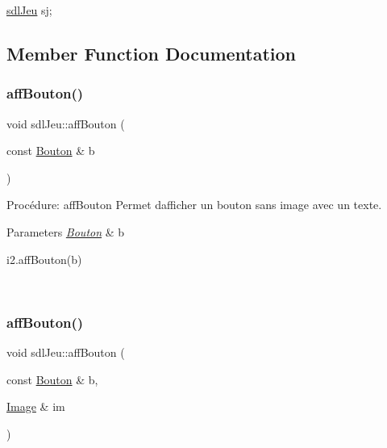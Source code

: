\begin{DoxyCode}
\hyperlink{classsdlJeu}{sdlJeu} sj;
\end{DoxyCode}
 

\subsection{Member Function Documentation}
\mbox{\label{classsdlJeu_a5ada7438cc0d3226ad2aa535a523a895}} 
\subsubsection{\texorpdfstring{aff\+Bouton()}{affBouton()}\hspace{0.1cm}{\footnotesize\ttfamily [1/2]}}
{\footnotesize\ttfamily void sdl\+Jeu\+::aff\+Bouton (\begin{DoxyParamCaption}\item[{const \hyperlink{classBouton}{Bouton} \&}]{b }\end{DoxyParamCaption})}



Procédure\+: aff\+Bouton Permet d\textquotesingle{}afficher un bouton sans image avec un texte. 


\begin{DoxyParams}{Parameters}
{\em \hyperlink{classBouton}{Bouton}} & b 
\begin{DoxyCode}
i2.affBouton(b)
\end{DoxyCode}
 \\
\hline
\end{DoxyParams}
\mbox{\label{classsdlJeu_a71bd3bdde9cf7a273b2ec05b08fdc361}} 
\subsubsection{\texorpdfstring{aff\+Bouton()}{affBouton()}\hspace{0.1cm}{\footnotesize\ttfamily [2/2]}}
{\footnotesize\ttfamily void sdl\+Jeu\+::aff\+Bouton (\begin{DoxyParamCaption}\item[{const \hyperlink{classBouton}{Bouton} \&}]{b,  }\item[{\hyperlink{classImage}{Image} \&}]{im }\end{DoxyParamCaption})}



